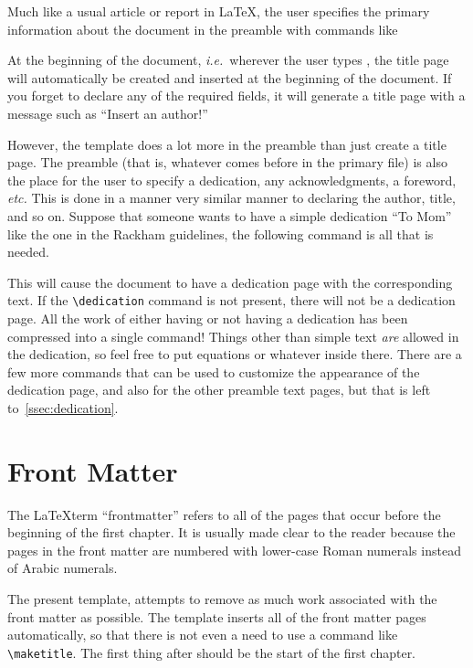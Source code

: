 Much like a usual article or report in \LaTeX, the user specifies the
primary information about the document in the preamble with commands
like
\begin{code}
\author{Derek J. Dalle}
\end{code}
At the beginning of the document, \textit{i.e.}~wherever the user
types \verb||, the title page will automatically be
created and inserted at the beginning of the document.  If you
forget to declare any of the required fields, it will generate a
title page with a message such as ``Insert an author!''

However, the template does a lot more in the preamble than just create
a title page.  The preamble (that is, whatever comes before
\verb|| in the primary  file) is also the
place for the user to specify a dedication, any acknowledgments, a
foreword, \textit{etc.}  This is done in a manner very similar manner
to declaring the author, title, and so on.  Suppose that someone wants
to have a simple dedication ``To Mom'' like the one in the Rackham
guidelines, the following command is all that is needed.
\begin{code}
\dedication{To Mom}
\end{code}
This will cause the document to have a dedication page with the
corresponding text.  If the \verb|\dedication| command is not present,
there will not be a dedication page.  All the work of either having or
not having a dedication has been compressed into a single command!
Things other than simple text \emph{are} allowed in the dedication, so
feel free to put equations or whatever inside there.  There are a few
more commands that can be used to customize the appearance of the
dedication page, and also for the other preamble text pages, but that
is left to~\cref{ssec:dedication}.


\section{Front Matter}
The \LaTeX term ``frontmatter'' refers to all of the pages that occur
before the beginning of the first chapter.  It is usually made clear
to the reader because the pages in the front matter are numbered with
lower-case Roman numerals instead of Arabic numerals.

The present template,  attempts to remove as
much work associated with the front matter as possible.  The template
inserts all of the front matter pages automatically, so that there is
not even a need to use a command like \verb|\maketitle|.  The first
thing after \verb|| should be the start of the first
chapter.

